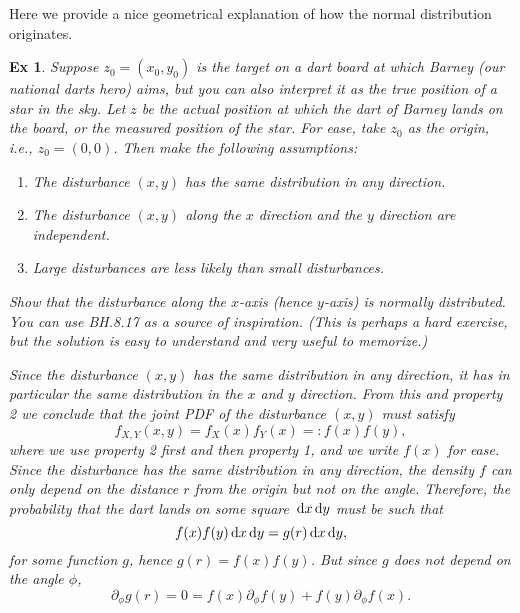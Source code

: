 \documentclass[a4paper,11pt]{article}
\newtheorem{exercise}[theorem]{Ex}
\begin{document}
Here we provide  a nice geometrical explanation of how the normal distribution originates.

\begin{exercise}\label{ex:1}
Suppose $z_0=(x_0,y_{0})$ is the target on a dart board at which Barney (our national darts hero) aims, but you can also interpret it as the true position of a star in the sky.
Let $z$ be the actual position at which the dart of Barney lands on the board, or the measured position of the star.
For ease, take $z_0$ as the origin, i.e., $z_0=(0,0)$.
Then make the following assumptions:
\begin{enumerate}
\item The disturbance $(x,y)$ has the same distribution in any direction.
\item The disturbance $(x,y)$ along the $x$ direction and the $y$ direction are independent.
\item Large disturbances are less likely than small disturbances.
\end{enumerate}
Show that the disturbance along the $x$-axis (hence $y$-axis) is normally distributed. You can use BH.8.17 as a source of inspiration. (This is perhaps a hard exercise, but  the solution is easy to understand and very useful to memorize.)

\begin{solution}
Since the disturbance $(x,y)$ has the same distribution in any direction, it has in particular the same distribution in the $x$ and $y$ direction.
From this and property 2 we conclude that the joint PDF of the disturbance $(x,y)$ must satisfy
\begin{equation}
  \label{eq:051}
  f_{X,Y}(x,y) = f_X(x)f_Y(x) =: f(x)f(y),
\end{equation}
where we use property 2 first and then property 1, and we write $f(x)$ for ease.
Since the disturbance has the same distribution in \textit{any} direction, the density $f$ can only depend on the distance $r$ from the origin but not on the angle. Therefore, the probability that the dart lands on some square $\,\textrm{d}x\,\textrm{d}y$ must be such that
\begin{equation}
  \label{eq:054}
  f(x)f(y) \,\textrm{d}x \,\textrm{d}y = g(r) \,\textrm{d}x \,\textrm{d}y,
\end{equation}
for some function $g$, hence $g(r) = f(x)f(y)$. But since $g$ does not depend on the angle $\phi$,
\begin{equation}
\label{eq:055}
\partial_{\phi} g(r) = 0 = f(x) \partial_{\phi}f(y) + f(y) \partial_{\phi}f(x).
\end{equation}


\end{solution}
\end{exercise}
\end{document}
